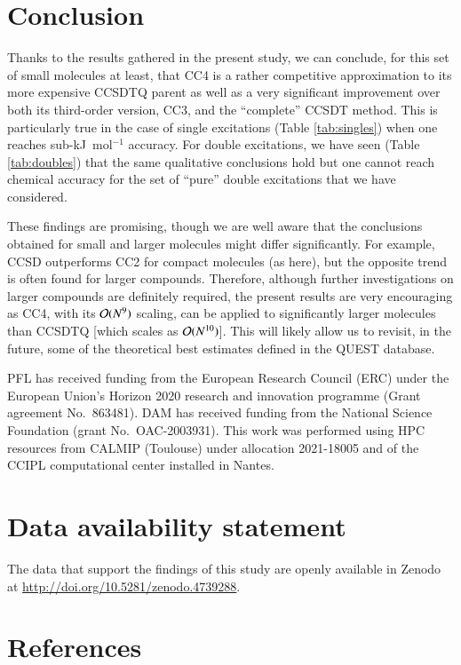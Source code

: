 \documentclass[aip,jcp,reprint,noshowkeys,superscriptaddress]{revtex4-1}
\begin{document}
\section{Conclusion}

Thanks to the results gathered in the present study, we can conclude, for this set of small molecules at least, that CC4 is a rather competitive approximation to its more expensive CCSDTQ parent as well as a very significant improvement over both its third-order version, CC3, and the ``complete'' CCSDT method.
This is particularly true in the case of single excitations (Table \ref{tab:singles}) when one reaches sub-kJ~mol$^{-1}$ accuracy.
For double excitations, we have seen (Table \ref{tab:doubles}) that the same qualitative conclusions hold but one cannot reach chemical accuracy for the set of ``pure'' double excitations that we have considered.

These findings are promising, though we are well aware that the conclusions obtained for small and larger molecules might differ significantly.
For example, CCSD outperforms CC2 for compact molecules (as here), but the opposite trend is often found for larger compounds.\cite{Loos_2018a,Loos_2020a,Veril_2021} 
Therefore, although further investigations on larger compounds are definitely required, the present results are very encouraging as CC4, with its $\order*{N^9}$ scaling, can be applied to significantly larger molecules than CCSDTQ [which scales as $\order*{N^{10}}$]. 
This will likely allow us to revisit, in the future, some of the theoretical best estimates defined in the QUEST database.\cite{Loos_2020a,Veril_2021}

\begin{acknowledgements}
PFL has received funding from the European Research Council (ERC) under the European Union's Horizon 2020 research and innovation programme (Grant agreement No.~863481).
DAM has received funding from the National Science Foundation (grant No.~OAC-2003931).
This work was performed using HPC resources from CALMIP (Toulouse) under allocation 2021-18005 and of the CCIPL computational center installed in Nantes.
\end{acknowledgements}

\section*{Data availability statement}
The data that support the findings of this study are openly available in Zenodo at \href{http://doi.org/10.5281/zenodo.4739288}{http://doi.org/10.5281/zenodo.4739288}.

\section*{References}

\end{document}

